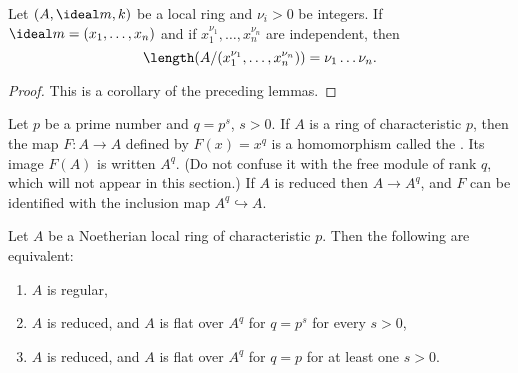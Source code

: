 \documentclass[../main]{subfiles}
\begin{document}
\begin{lemma}\label{lem:42.03}
Let $(A, \ideal m, k)$ be a local ring and $\nu_i>0$ be integers. If $\ideal m=(x_1, \ldots, x_n)$ and if $x_1^{\nu_1}, \ldots, x_n^{\nu_n}$ are independent, then \[\length(A /(x_1^{\nu_1}, \ldots, x_n^{\nu_n}))=\nu_1 \ldots \nu_n.\]
\end{lemma}

\begin{proof}
This is a corollary of the preceding lemmas.
\end{proof}

\newparagraph Let $p$ be a prime number and $q=p^s$, $s>0$. If $A$ is a ring of characteristic $p$, then the map $F: A\longrightarrow A$ defined by $F(x)=x^q$ is a homomorphism called the . Its image $F(A)$ is written $A^q$. (Do not confuse it with the free module of rank $q$, which will not appear in this section.) If $A$ is reduced then $A\longrightarrow A^q$, and $F$ can be identified with the inclusion map $A^q \hookrightarrow A$.

\begin{theorem}[E. Kunz]\label{thm:107}
Let $A$ be a Noetherian local ring of characteristic $p$. Then the following are equivalent: 
\begin{enumerate}[label=(\arabic*)]
    \item $A$ is regular,
    \item $A$ is reduced, and $A$ is flat over $A^q$ for $q=p^s$ for every $s>0$,
    \item $A$ is reduced, and $A$ is flat over $A^q$ for $q=p$ for at least one $s>0$.
\end{enumerate}
\end{theorem}
\end{document}
